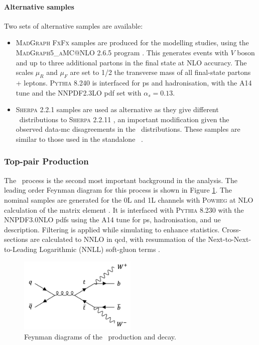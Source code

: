 \paragraph{Alternative samples} Two sets of alternative samples are available:
\begin{itemize}
  \item \textsc{MadGraph FxFx} samples are produced for the modelling studies, using the \textsc{MadGraph5\_aMC@NLO} 2.6.5 program \cite{madgraph}. This generates events with $V$ boson and up to three additional partons in the final state at NLO accuracy. The scales $\mu_R$ and $\mu_F$ are set to 1/2 the transverse mass of all final-state partons + leptons. \textsc{Pythia} 8.240 is interfaced for \gls{ps} and hadronisation, with the A14 tune and the NNPDF2.3LO \gls{pdf} set with $\alpha_s = 0.13$.
  \item \textsc{Sherpa} 2.2.1 \cite{sherpa2.2paper} samples are used as alternative as they give different \ptv\ distributions to \textsc{Sherpa} 2.2.11 \cite{simVjet}, an important modification given the observed data-\gls{mc} disagreements in the \ptv\ distributions. These samples are similar to those used in the standalone \vhc\ \cite{Collaboration:2721696}.
\end{itemize}

\subsubsection{Top-pair Production}\label{subsec-vh-top-samples}
The \ttb\ process is the second most important background in the analysis. The leading order Feynman diagram for this process is shown in Figure \ref{fig:feynttb}. The nominal samples are generated for the 0L and 1L channels with \textsc{Powheg} at NLO calculation of the matrix element \cite{StefanoFrixione_2007, PaoloNason_2004}. It is interfaced with \textsc{Pythia} 8.230 with the NNPDF3.0NLO \glspl{pdf} using the A14 tune for \gls{ps}, hadronisation, and \gls{ue} description. Filtering is applied while simulating to enhance statistics. Cross-sections are calculated to NNLO in \gls{qcd}, with resummation of the Next-to-Next-to-Leading Logarithmic (NNLL) soft-gluon terms \cite{CZAKON20142930}.

\begin{figure}[h!]
  \center
  \includegraphics[width=0.5\textwidth]{Images/VH/Feynman/ttb.png}
  \caption{Feynman diagrams of the \ttb\ production and decay.} 
  \label{fig:feynttb}
\end{figure}

